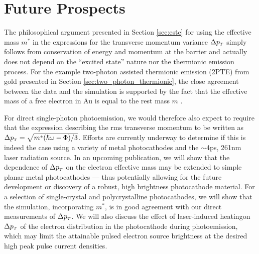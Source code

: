 \section{Future Prospects} \label{sec:photocathode_future}

The philosophical argument presented in Section \ref{sec:este} for using the effective mass $m^*$ in the expressions for the transverse momentum variance $\Delta p_{{\scriptscriptstyle T}}$ simply follows from conservation of energy and momentum at the barrier and actually does not depend on the ``excited state'' nature nor the thermionic emission process.
For the example two-photon assisted thermionic emission (2PTE) from gold presented in Section \ref{sec:two_photon_thermionic}, the close agreement between the data and the simulation is supported by the fact that the effective mass of a free electron in Au is equal to the rest mass $m$ \cite{johnson_optical_1972}.

For direct single-photon photoemission, we would therefore also expect to require that the expression describing the rms transverse momentum to be written as $\Delta p_{{\scriptscriptstyle T}} = \sqrt{m^* ( \hbar \omega - \Phi ) / 3 }$.
Efforts are currently underway to determine if this is indeed the case using a variety of metal photocathodes and the $\sim$4ps, 261nm laser radiation source.
In an upcoming publication, we will show that the dependence of $\Delta p_{{\scriptscriptstyle T}}$ on the electron effective mass may be extended to simple planar metal photocathodes --- thus potentially allowing for the future development or discovery of a robust, high brightness photocathode material.
For a selection of single-crystal and polycrystalline photocathodes, we will show that the simulation, incorporating $m^*$, is in good agreement with our direct measurements of $\Delta p_{{\scriptscriptstyle T}}$.
We will also discuss the effect of laser-induced heatingon $\Delta p_{{\scriptscriptstyle T}}$ of the electron distribution in the photocathode during photoemission, which may limit the attainable pulsed electron source brightness at the desired high peak pulse current densities.
